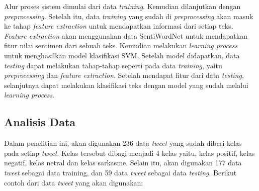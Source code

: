 \begin{adjustbox}{width=1\textwidth}
\noindent\begin{minipage}{\linewidth}
\end{minipage}
\end{adjustbox}

Alur proses sistem dimulai dari data \textit{training}. Kemudian dilanjutkan dengan \textit{preprocessing}. Setelah itu, data \textit{training} yang sudah di \textit{preprocessing }akan masuk ke tahap \textit{feature extraction} untuk mendapatkan informasi dari setiap teks. \textit{Feature extraction }akan menggunakan data SentiWordNet untuk mendapatkan fitur nilai sentimen dari sebuah teks. Kemudian melakukan \textit{learning process} untuk menghasilkan model klasifikasi SVM. Setelah model didapatkan, data \textit{testing} dapat melakukan tahap-tahap seperti pada data \textit{training}, yaitu \textit{preprocessing }dan\textit{ feature extraction}. Setelah mendapat fitur dari data \textit{testing}, selanjutnya dapat melakukan klasifikasi teks dengan model yang sudah melalui \textit{learning process}. 

\subsection{Analisis Data}
Dalam penelitian ini, akan digunakan 236 data \textit{tweet} yang sudah diberi kelas pada setiap \textit{tweet}. Kelas tersebut dibagi menjadi 4 kelas yaitu, kelas positif, kelas negatif, kelas netral dan kelas sarkasme. Selain itu, akan digunakan 177 data \textit{tweet} sebagai data training, dan 59 data \textit{tweet} sebagai data \textit{testing}. Berikut contoh dari data \textit{tweet} yang akan digunakan:

